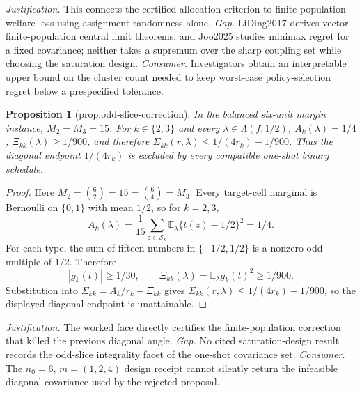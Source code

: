 \documentclass{article}
\newtheorem{proposition}{Proposition}
\begin{document}
\par\smallskip\noindent \textit{Justification.} This connects the certified allocation criterion to finite-population welfare loss using assignment randomness alone. \textit{Gap.} LiDing2017 derives vector finite-population central limit theorems, and Joo2025 studies minimax regret for a fixed covariance; neither takes a supremum over the sharp coupling set while choosing the saturation design. \textit{Consumer.} Investigators obtain an interpretable upper bound on the cluster count needed to keep worst-case policy-selection regret below a prespecified tolerance.

\begin{proposition}[prop:odd-slice-correction]\label{prop:odd-slice-correction}
In the balanced six-unit margin instance, \(M_2=M_3=15\). For \(k\in\{2,3\}\) and every \(\lambda\in\Lambda(f,1/2)\), \(A_k(\lambda)=1/4\), \(\Xi_{kk}(\lambda)\ge1/900\), and therefore \(\Sigma_{kk}(r,\lambda)\le1/(4r_k)-1/900\). Thus the diagonal endpoint \(1/(4r_k)\) is excluded by every compatible one-shot binary schedule.
\end{proposition}
\begin{proof}
Here \(M_2={6\choose2}=15={6\choose4}=M_3\). Every target-cell marginal is Bernoulli on \(\{0,1\}\) with mean \(1/2\), so for \(k=2,3\),
\[
A_k(\lambda)=\frac1{15}\sum_{z\in\mathcal S_k}\mathbb E_\lambda\{t(z)-1/2\}^2=1/4.
\]
For each type, the sum of fifteen numbers in \(\{-1/2,1/2\}\) is a nonzero odd multiple of \(1/2\). Therefore
\[
|g_k(t)|\ge1/30,\qquad \Xi_{kk}(\lambda)=\mathbb E_\lambda g_k(t)^2\ge1/900.
\]
Substitution into \(\Sigma_{kk}=A_k/r_k-\Xi_{kk}\) gives \(\Sigma_{kk}(r,\lambda)\le1/(4r_k)-1/900\), so the displayed diagonal endpoint is unattainable.
\end{proof}
\par\smallskip\noindent \textit{Justification.} The worked face directly certifies the finite-population correction that killed the previous diagonal angle. \textit{Gap.} No cited saturation-design result records the odd-slice integrality facet of the one-shot covariance set. \textit{Consumer.} The \(n_0=6\), \(m=(1,2,4)\) design receipt cannot silently return the infeasible diagonal covariance used by the rejected proposal.
\end{document}
